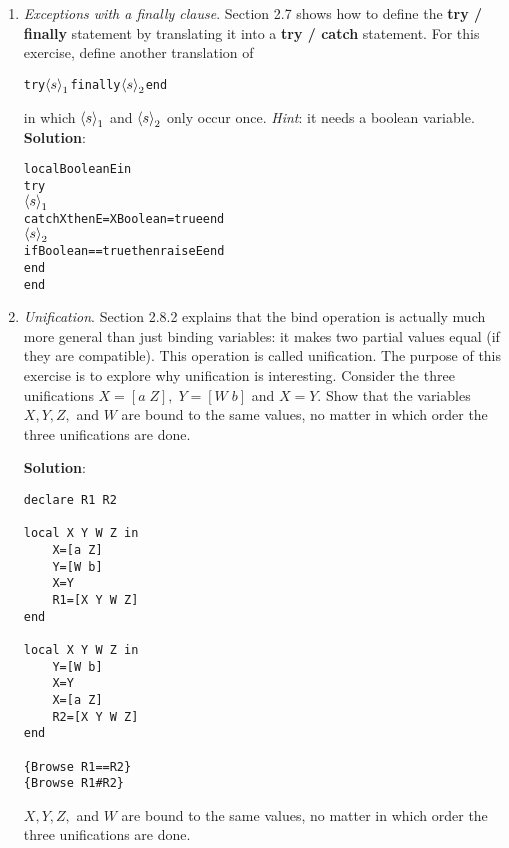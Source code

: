 \documentclass[11pt]{article}
\begin{document}
\begin{enumerate}
{\bfseries Sulution}:\\
\(([\{IsEven\;X1\}\{X\to x_n, X1\to x_{n+1}\}] \\ \)
\(([\{IsOdd\;X1\}\{X\to x_{n+1}, X1\to x_{n+2}\}] \\ \)
...\\
...\\
\(([\{IsEven\;X1\}\{X\to x_{n+k}, X1\to x_{n+(k+1)}\}] \\ \) 

In general, if each function in a mutually recursive set has just one
function call in its body, and this function call is a last call, then 
all functions in the set will execute with their stack size bounded by a constant.

\item {\itshape Exceptions with a finally clause}. Section 2.7 shows how to deﬁne the
{\bfseries try / finally} statement by translating it into a {\bfseries try / catch} statement. For this
exercise, deﬁne another translation of
\begin{alltt}
try \({\langle{s}\rangle}\sb{1}\) finally \({\langle{s}\rangle}\sb{2}\) end
\end{alltt}
in which \({\langle{s}\rangle}\sb{1}\) and \({\langle{s}\rangle}\sb{2}\) only occur once. {\itshape Hint}: it needs a boolean variable.
\newpage
{\bfseries Solution}:
\begin{alltt}
local Boolean E in
    try 
        \({\langle{s}\rangle}\sb{1}\)
        catch X then E=X Boolean=true end
        \({\langle{s}\rangle}\sb{2}\)
        if Boolean==true then raise E end
    end
end
\end{alltt}

\item {\itshape Uniﬁcation}. Section 2.8.2 explains that the bind operation is actually much
more general than just binding variables: it makes two partial values equal (if they
are compatible). This operation is called uniﬁcation. The purpose of this exercise is
to explore why uniﬁcation is interesting. Consider the three uniﬁcations \(X=[a\;Z],\;
Y=[W\;b]\) and \(X=Y\). Show that the variables \(X, Y, Z,\) and \(W\) are bound to the same
values, no matter in which order the three uniﬁcations are done.

{\bfseries Solution}:
\begin{verbatim}
declare R1 R2

local X Y W Z in
    X=[a Z]
    Y=[W b]
    X=Y
    R1=[X Y W Z]
end

local X Y W Z in
    Y=[W b]
    X=Y
    X=[a Z]
    R2=[X Y W Z]
end

{Browse R1==R2}
{Browse R1#R2}
\end{verbatim}
\(X, Y, Z,\) and \(W\) are bound to the same
values, no matter in which order the three uniﬁcations are done.
\end{enumerate}
\end{document}
